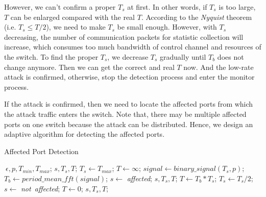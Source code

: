 However, we can't confirm a proper $T_s$ at first. In other words, if $T_s$ is too large, $T$ can be enlarged compared with the real $T$. According to the \emph{Nyquist} theorem (i.e. $T_s \le T/2$), we need to make $T_s$ be small enough. However, with $T_s$ decreasing, the number of communication packets for statistic collection will increase, which consumes too much bandwidth of control channel and resources of the switch. To find the proper $T_s$, we decrease $T_s$ gradually until $T_b$ does not change anymore. Then we can get the correct and real $T$ now. And the low-rate attack is confirmed, otherwise, stop the detection process and enter the monitor process. 

If the attack is confirmed, then we need to locate the affected ports from which the attack traffic enters the switch. Note that, there may be multiple affected ports on one switch because the attack can be distributed. Hence, we design an adaptive algorithm for detecting the affected ports.

\begin{algorithm}[H]
  \caption{Affected Port Detection}
  \label{alg:port_locate}
  \begin{algorithmic}[1]
  \REQUIRE $~{\epsilon}, p, T_{min}, T_{max}$;
  \ENSURE $s, T_s, T$;
  \STATE $T_s \gets T_{max}$;
  \STATE $T \gets \infty$; 
      \STATE $signal \gets binary\_signal(T_s, p)$;
      \STATE $T_b \gets period\_mean\_fft(signal)$;
            \STATE $s \gets$ \emph{affected};
              \RETURN $s, T_s, T$;
        \ELSE
          \STATE $T \gets T_b * T_s$;
          \STATE $T_s \gets T_s / 2$;
      \ENDIF 
  \ENDWHILE
  \STATE $s \gets$ \emph{not~affected};
  \STATE $T \gets 0$; 
  \RETURN $s, T_s, T$;
  \end{algorithmic}
\end{algorithm}


